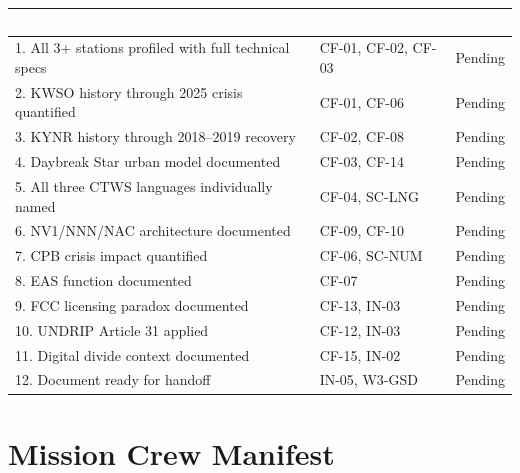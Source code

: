 \documentclass[11pt,letterpaper]{article}
\newcommand{\tableheader}[1]{\textbf{\sffamily\textcolor{white}{#1}}}
\begin{document}
\begin{center}
\begin{tabularx}{\textwidth}{XL{3.8cm}C{1.5cm}}
\toprule
{}
\tableheader{Success Criterion} & \tableheader{Test ID(s)} & \tableheader{Status} \\
. All 3+ stations profiled with full technical specs & CF-01, CF-02, CF-03 & Pending \\
2. KWSO history through 2025 crisis quantified & CF-01, CF-06 & Pending \\
3. KYNR history through 2018--2019 recovery & CF-02, CF-08 & Pending \\
4. Daybreak Star urban model documented & CF-03, CF-14 & Pending \\
5. All three CTWS languages individually named & CF-04, SC-LNG & Pending \\
6. NV1/NNN/NAC architecture documented & CF-09, CF-10 & Pending \\
7. CPB crisis impact quantified & CF-06, SC-NUM & Pending \\
8. EAS function documented & CF-07 & Pending \\
9. FCC licensing paradox documented & CF-13, IN-03 & Pending \\
10. UNDRIP Article 31 applied & CF-12, IN-03 & Pending \\
11. Digital divide context documented & CF-15, IN-02 & Pending \\
12. Document ready for handoff & IN-05, W3-GSD & Pending \\
\bottomrule
\end{tabularx}
\end{center}

\section{Mission Crew Manifest}
\end{document}
